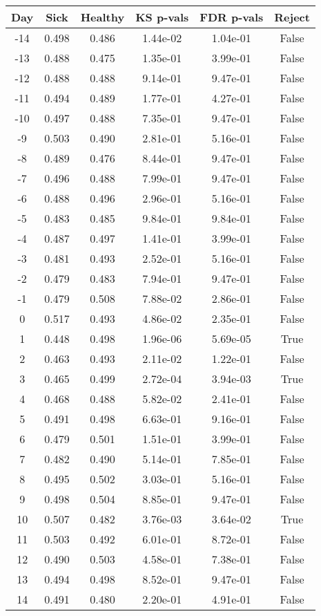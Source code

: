 \begin{tabular}{c|c|c|c|c|c}
Day &  Sick & Healthy &  KS p-vals & FDR p-vals & Reject\\
\hline
-14 & 0.498 &   0.486 &   1.44e-02 &   1.04e-01 &  False\\
-13 & 0.488 &   0.475 &   1.35e-01 &   3.99e-01 &  False\\
-12 & 0.488 &   0.488 &   9.14e-01 &   9.47e-01 &  False\\
-11 & 0.494 &   0.489 &   1.77e-01 &   4.27e-01 &  False\\
-10 & 0.497 &   0.488 &   7.35e-01 &   9.47e-01 &  False\\
 -9 & 0.503 &   0.490 &   2.81e-01 &   5.16e-01 &  False\\
 -8 & 0.489 &   0.476 &   8.44e-01 &   9.47e-01 &  False\\
 -7 & 0.496 &   0.488 &   7.99e-01 &   9.47e-01 &  False\\
 -6 & 0.488 &   0.496 &   2.96e-01 &   5.16e-01 &  False\\
 -5 & 0.483 &   0.485 &   9.84e-01 &   9.84e-01 &  False\\
 -4 & 0.487 &   0.497 &   1.41e-01 &   3.99e-01 &  False\\
 -3 & 0.481 &   0.493 &   2.52e-01 &   5.16e-01 &  False\\
 -2 & 0.479 &   0.483 &   7.94e-01 &   9.47e-01 &  False\\
 -1 & 0.479 &   0.508 &   7.88e-02 &   2.86e-01 &  False\\
  0 & 0.517 &   0.493 &   4.86e-02 &   2.35e-01 &  False\\
  1 & 0.448 &   0.498 &   1.96e-06 &   5.69e-05 &   True\\
  2 & 0.463 &   0.493 &   2.11e-02 &   1.22e-01 &  False\\
  3 & 0.465 &   0.499 &   2.72e-04 &   3.94e-03 &   True\\
  4 & 0.468 &   0.488 &   5.82e-02 &   2.41e-01 &  False\\
  5 & 0.491 &   0.498 &   6.63e-01 &   9.16e-01 &  False\\
  6 & 0.479 &   0.501 &   1.51e-01 &   3.99e-01 &  False\\
  7 & 0.482 &   0.490 &   5.14e-01 &   7.85e-01 &  False\\
  8 & 0.495 &   0.502 &   3.03e-01 &   5.16e-01 &  False\\
  9 & 0.498 &   0.504 &   8.85e-01 &   9.47e-01 &  False\\
 10 & 0.507 &   0.482 &   3.76e-03 &   3.64e-02 &   True\\
 11 & 0.503 &   0.492 &   6.01e-01 &   8.72e-01 &  False\\
 12 & 0.490 &   0.503 &   4.58e-01 &   7.38e-01 &  False\\
 13 & 0.494 &   0.498 &   8.52e-01 &   9.47e-01 &  False\\
 14 & 0.491 &   0.480 &   2.20e-01 &   4.91e-01 &  False\\
\end{tabular}